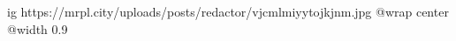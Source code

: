  
 
 
 
 

\ifcmt
  ig https://mrpl.city/uploads/posts/redactor/vjcmlmiyytojkjnm.jpg
  @wrap center
  @width 0.9
\fi
